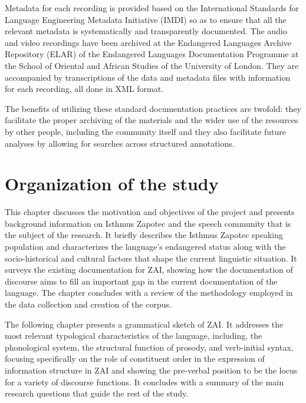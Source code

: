 Metadata for each recording is provided based on the International Standards for Language Engineering Metadata Initiative (IMDI) so as to ensure that all the relevant metadata is systematically and transparently documented. The audio and video recordings have been archived at the Endangered Languages Archive Repository (ELAR) of the Endangered Languages Documentation Programme at the School of Oriental and African Studies of the University of London. They are accompanied by transcriptions of the data and metadata files with information for each recording, all done in XML format. 	

The benefits of utilizing these standard documentation practices are twofold: they facilitate the proper archiving of the materials and the wider use of the resources by other people, including the community itself and they also facilitate future analyses by allowing for searches across structured annotations.



\section{Organization of the study}

This chapter discusses the motivation and objectives of the project and presents background information on Isthmus Zapotec and the speech community that is the subject of the research. It briefly describes the Isthmus Zapotec speaking population and characterizes the language's endangered status along with the socio-historical and cultural factors that shape the current linguistic situation. It surveys the existing documentation for ZAI, showing how the documentation of discourse aims to fill an important gap in the current documentation of the language. The chapter concludes with a review of the methodology employed in the data collection and creation of the corpus.

The following chapter presents a grammatical sketch of ZAI. It addresses the most relevant typological characteristics of the language, including, the phonological system, the structural function of prosody, and verb-initial syntax, focusing specifically on the role of constituent order in the expression of information structure in ZAI and showing the pre-verbal position to be the locus for a variety of discourse functions. It concludes with a summary of the main research questions that guide the rest of the study.

